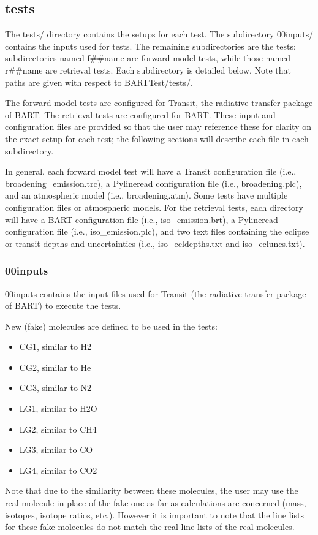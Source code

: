 \documentclass[letterpaper, 12pt]{article}
\begin{document}
\subsection{tests}
\label{sec:tests}
The tests/ directory contains the setups for each test. The subdirectory 
00inputs/ contains the inputs used for tests. The remaining 
subdirectories are the tests; subdirectories named f{\#}{\#}name are forward 
model tests, while those named r{\#}{\#}name are retrieval tests. Each 
subdirectory is detailed below. Note that paths are given with respect to 
BARTTest/tests/.

The forward model tests are configured for Transit, the radiative transfer 
package of BART. The retrieval tests are configured for BART. These 
input and configuration files are provided so that the user may reference 
these for clarity on the exact setup for each test; the following sections 
will describe each file in each subdirectory. 

In general, each forward model test will have a Transit configuration 
file (i.e., broadening{\_}emission.trc), a Pylineread configuration file 
(i.e., broadening.plc), and an atmospheric model (i.e., broadening.atm). 
Some tests have multiple configuration files or atmospheric models. 
For the retrieval tests, each directory 
will have a BART configuration file (i.e., iso{\_}emission.brt), a 
Pylineread configuration file (i.e., iso{\_}emission.plc), and two 
text files containing the eclipse or transit depths and uncertainties 
(i.e., iso{\_}ecldepths.txt and iso{\_}ecluncs.txt).

\subsubsection{00inputs}
\label{sec:inputs}
00inputs contains the input files used for Transit (the radiative transfer 
package of BART) to execute the tests.

New (fake) molecules are defined to be used in the tests:
\begin{itemize} \itemsep0pt
  \item CG1, similar to H2
  \item CG2, similar to He
  \item CG3, similar to N2
  \item LG1, similar to H2O
  \item LG2, similar to CH4
  \item LG3, similar to CO
  \item LG4, similar to CO2
\end{itemize}
Note that due to the similarity between these molecules, the user may use 
the real molecule in place of the fake one as far as calculations are 
concerned (mass, isotopes, isotope ratios, etc.). However it is important to 
note that the line lists for these fake molecules do not match the real line 
lists of the real molecules.\\
\end{document}
